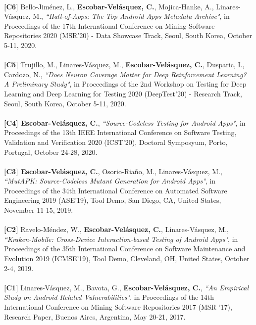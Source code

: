 \documentclass[letterpaper,11pt,oneside]{article}
\begin{document}
\\
\noindent \textbf{[C6]} Bello-Jiménez, L., \textbf{Escobar-Velásquez, C.}, Mojica-Hanke, A., Linares-V\'asquez,  M., \textit{``Hall-of-Apps: The Top Android Apps Metadata Archive"}, in Proceedings of the 17th International Conference on Mining Software Repositories 2020 (MSR’20) - Data Showcase Track, Seoul, South Korea, October 5-11, 2020. \\
\\
\noindent \textbf{[C5]} Trujillo, M., Linares-V\'asquez,  M., \textbf{Escobar-Velásquez, C.}, Dusparic, I., Cardozo, N., \textit{``Does Neuron Coverage Matter for Deep Reinforcement Learning? A Preliminary Study"}, in Proceedings of the 2nd Workshop on Testing for Deep Learning and Deep Learning for Testing 2020 (DeepTest’20) - Research Track, Seoul, South Korea, October 5-11, 2020. \\
\\
\noindent \textbf{[C4] Escobar-Velásquez, C.}, \textit{``Source-Codeless Testing for Android Apps"}, in Proceedings of the 13th IEEE International Conference on Software Testing, Validation and Verification 2020 (ICST’20), Doctoral Symposyum, Porto, Portugal, October 24-28, 2020. \\
\\
\noindent \textbf{[C3] Escobar-Velásquez, C.}, Osorio-Riaño, M., Linares-Vásquez, M., \textit{``MutAPK: Source-Codeless Mutant Generation for Android Apps"}, in Proceedings of the 34th International Conference on Automated Software Engineering 2019 (ASE’19), Tool Demo, San Diego, CA, United States, November 11-15, 2019. \\
\\
\noindent \textbf{[C2]} Ravelo-Méndez, W., \textbf{Escobar-Velásquez, C.}, Linares-Vásquez, M., \textit{``Kraken-Mobile: Cross-Device Interaction-based Testing of Android Apps"}, in Proceedings of the 35th International Conference on Software Maintenance and Evolution 2019 (ICMSE’19), Tool Demo, Cleveland, OH, United States, October 2-4, 2019. \\
\\
\noindent \textbf{[C1]} Linares-Vásquez, M., Bavota, G., \textbf{Escobar-Velásquez, C.}, \textit{``An Empirical Study on Android-Related Vulnerabilities"}, in Proceedings of the 14th International Conference on Mining Software Repositories 2017 (MSR ’17), Research Paper, Buenos Aires, Argentina, May 20-21, 2017. \\
\\

\end{document}
